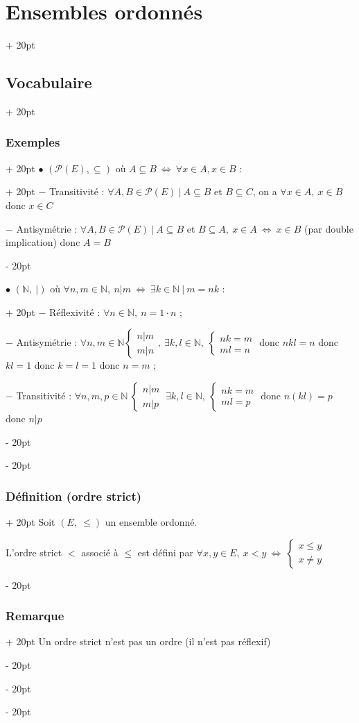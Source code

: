 \documentclass[a4paper, 12pt, twoside]{article}
\newcommand{\N}{\mathbb{N}} %
\newcommand{\ssi}{\ \Leftrightarrow \ }
\newcommand{\eqsys}[2]{\begin{cases} #1 \\ #2 \end{cases}}
\renewcommand{\le}{\leqslant}
\newcommand{\ind}[1][20pt]{\advance\leftskip + #1}
\newcommand{\deind}[1][20pt]{\advance\leftskip - #1}
\newenvironment{indt}[2][20pt]{#2 \par \ind[#1]}{\par \deind} %
\begin{document}
\begin{indt}{\section{Ensembles ordonnés}}
\begin{indt}{\subsection{Vocabulaire}}
\begin{indt}{\subsubsection{Exemples}}
\begin{indt}{$\bullet$ $(\mathcal P(E), \subseteq)$ où $A \subseteq B \ssi \forall x \in A, x \in B$ :}
                    $-$ Transitivité : $\forall A, B \in \mathcal P(E)\ |\ A \subseteq B$ et $B \subseteq C$, on a $\forall x \in A,\ x \in B$ donc $x \in C$
                    
                    $-$ Antisymétrie : $\forall A, B \in \mathcal P(E)\ |\ A \subseteq B$ et $B \subseteq A,\ x \in A \ssi x \in B$ (par double implication) donc $A = B$
                \end{indt}
                
                \vspace{6pt}
                
                \begin{indt}{$\bullet$ $(\N,\ |)$ où $\forall n, m \in \N,\ n | m \ssi \exists k \in \N\ |\ m = nk$ :}
                    $-$ Réflexivité : $\forall n \in \N,\ n = 1 \cdot n$ ;
                    
                    $-$ Antisymétrie : $\forall n, m \in \N \eqsys{n|m}{m|n},\ \exists k, l \in \N,\ \eqsys{nk = m}{ml = n}$
                    donc $nkl = n$ donc $kl = 1$ donc $k = l = 1$ donc $n = m$ ;
                    
                    $-$ Transitivité : $\forall n, m, p \in \N\ \eqsys{n|m}{m|p}\ \exists k, l \in \N,\ \eqsys{nk = m}{ml = p}$ donc $n(kl) = p$ donc $n|p$
                \end{indt}
            \end{indt}
            
            \vspace{6pt}
            
            \begin{indt}{\subsubsection{Définition (ordre strict)}}
                Soit $(E,\ \le)$ un ensemble ordonné.
                
                L'ordre strict $<$ associé à $\le$ est défini par $\forall x, y \in E,\ x < y \ssi \eqsys{x \le y}{x \neq y}$
            \end{indt}
            
            \vspace{6pt}
            
            \begin{indt}{\subsubsection{Remarque}}
                Un ordre strict n'est pas un ordre (il n'est pas réflexif)
            \end{indt}
            

\end{indt}
\end{indt}
\end{document}
